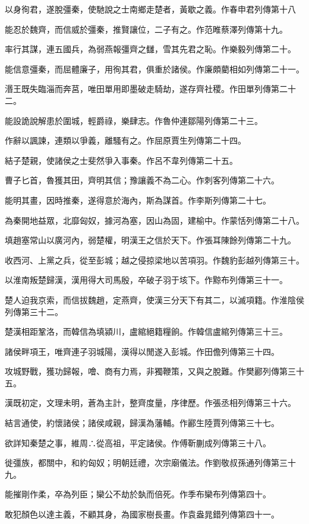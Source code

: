 \begin{pinyinscope}
以身徇君，遂脫彊秦，使馳說之士南鄉走楚者，黃歇之義。作春申君列傳第十八

能忍於魏齊，而信威於彊秦，推賢讓位，二子有之。作范睢蔡澤列傳第十九。

率行其謀，連五國兵，為弱燕報彊齊之讎，雪其先君之恥。作樂毅列傳第二十。

能信意彊秦，而屈體廉子，用徇其君，俱重於諸侯。作廉頗藺相如列傳第二十一。

湣王既失臨淄而奔莒，唯田單用即墨破走騎劫，遂存齊社稷。作田單列傳第二十二。

能設詭說解患於圍城，輕爵祿，樂肆志。作魯仲連鄒陽列傳第二十三。

作辭以諷諫，連類以爭義，離騷有之。作屈原賈生列傳第二十四。

結子楚親，使諸侯之士斐然爭入事秦。作呂不韋列傳第二十五。

曹子匕首，魯獲其田，齊明其信；豫讓義不為二心。作刺客列傳第二十六。

能明其畫，因時推秦，遂得意於海內，斯為謀首。作李斯列傳第二十七。

為秦開地益眾，北靡匈奴，據河為塞，因山為固，建榆中。作蒙恬列傳第二十八。

填趙塞常山以廣河內，弱楚權，明漢王之信於天下。作張耳陳餘列傳第二十九。

收西河、上黨之兵，從至彭城；越之侵掠梁地以苦項羽。作魏豹彭越列傳第三十。

以淮南叛楚歸漢，漢用得大司馬殷，卒破子羽于垓下。作黥布列傳第三十一。

楚人迫我京索，而信拔魏趙，定燕齊，使漢三分天下有其二，以滅項籍。作淮陰侯列傳第三十二。

楚漢相距鞏洛，而韓信為填潁川，盧綰絕籍糧餉。作韓信盧綰列傳第三十三。

諸侯畔項王，唯齊連子羽城陽，漢得以閒遂入彭城。作田儋列傳第三十四。

攻城野戰，獲功歸報，噲、商有力焉，非獨鞭策，又與之脫難。作樊酈列傳第三十五。

漢既初定，文理未明，蒼為主計，整齊度量，序律歷。作張丞相列傳第三十六。

結言通使，約懷諸侯；諸侯咸親，歸漢為藩輔。作酈生陸賈列傳第三十七。

欲詳知秦楚之事，維周∴從高祖，平定諸侯。作傅靳蒯成列傳第三十八。

徙彊族，都關中，和約匈奴；明朝廷禮，次宗廟儀法。作劉敬叔孫通列傳第三十九。

能摧剛作柔，卒為列臣；欒公不劫於埶而倍死。作季布欒布列傳第四十。

敢犯顏色以達主義，不顧其身，為國家樹長畫。作袁盎晁錯列傳第四十一。


\end{pinyinscope}
